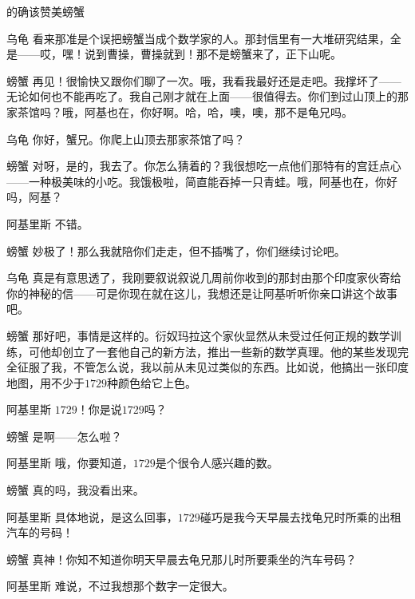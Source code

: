 \begin{dialog}{的确该赞美螃蟹}
\begin{dialogue}
\item[乌龟]看来那准是个误把螃蟹当成个数学家的人。那封信里有一大堆研究结果，全是——哎，嘿！说到曹操，曹操就到！那不是螃蟹来了，正下山呢。

\item[螃蟹]再见！很愉快又跟你们聊了一次。哦，我看我最好还是走吧。我撑坏了——无论如何也不能再吃了。我自己刚才就在上面——很值得去。你们到过山顶上的那家茶馆吗？哦，阿基也在，你好啊。哈，哈，噢，噢，那不是龟兄吗。

\item[乌龟]你好，蟹兄。你爬上山顶去那家茶馆了吗？

\item[螃蟹]对呀，是的，我去了。你怎么猜着的？我很想吃一点他们那特有的宫廷点心——一种极美味的小吃。我饿极啦，简直能吞掉一只青蛙。哦，阿基也在，你好吗，阿基？

\item[阿基里斯]不错。

\item[螃蟹]妙极了！那么我就陪你们走走，但不插嘴了，你们继续讨论吧。

\item[乌龟]真是有意思透了，我刚要叙说叙说几周前你收到的那封由那个印度家伙寄给你的神秘的信——可是你现在就在这儿，我想还是让阿基听听你亲口讲这个故事吧。

\item[螃蟹]那好吧，事情是这样的。衍奴玛拉这个家伙显然从未受过任何正规的数学训练，可他却创立了一套他自己的新方法，推出一些新的数学真理。他的某些发现完全征服了我，不管怎么说，我以前从未见过类似的东西。比如说，他搞出一张印度地图，用不少于$1729$种颜色给它上色。

\item[阿基里斯]$1729$！你是说$1729$吗？

\item[螃蟹]是啊——怎么啦？

\item[阿基里斯]哦，你要知道，$1729$是个很令人感兴趣的数。

\item[螃蟹]真的吗，我没看出来。

\item[阿基里斯]具体地说，是这么回事，$1729$碰巧是我今天早晨去找龟兄时所乘的出租汽车的号码！

\item[螃蟹]真神！你知不知道你明天早晨去龟兄那儿时所要乘坐的汽车号码？

\item[阿基里斯]难说，不过我想那个数字一定很大。


\end{dialogue}
\end{dialog}

